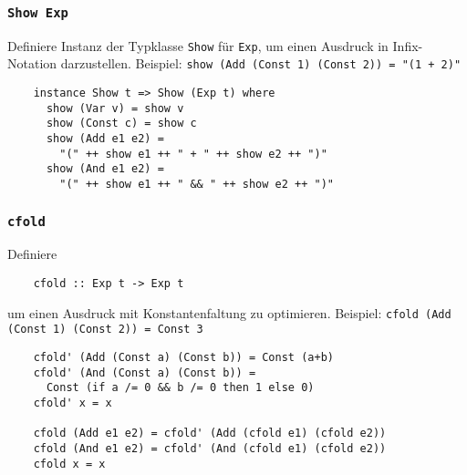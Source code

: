 \documentclass{beamer}
\begin{document}
\begin{frame}[fragile]
  \frametitle{\lstinline{Show Exp}}
  Definiere Instanz der Typklasse \lstinline{Show} für \lstinline{Exp},
  um einen Ausdruck in Infix-Notation darzustellen.
  Beispiel: \lstinline{show (Add (Const 1) (Const 2)) = "(1 + 2)"}
  \pause
  \begin{lstlisting}
    instance Show t => Show (Exp t) where
      show (Var v) = show v
      show (Const c) = show c
      show (Add e1 e2) =
        "(" ++ show e1 ++ " + " ++ show e2 ++ ")"
      show (And e1 e2) =
        "(" ++ show e1 ++ " && " ++ show e2 ++ ")"
  \end{lstlisting}
\end{frame}

\begin{frame}[fragile]
  \frametitle{\lstinline{cfold}}
  Definiere
  \begin{lstlisting}
    cfold :: Exp t -> Exp t
  \end{lstlisting}
  um einen Ausdruck mit Konstantenfaltung zu optimieren.
  Beispiel: \lstinline{cfold (Add (Const 1) (Const 2)) = Const 3}
  \pause
  \begin{lstlisting}
    cfold' (Add (Const a) (Const b)) = Const (a+b)
    cfold' (And (Const a) (Const b)) =
      Const (if a /= 0 && b /= 0 then 1 else 0)
    cfold' x = x
    
    cfold (Add e1 e2) = cfold' (Add (cfold e1) (cfold e2))
    cfold (And e1 e2) = cfold' (And (cfold e1) (cfold e2))
    cfold x = x
  \end{lstlisting}
\end{frame}
\end{document}
